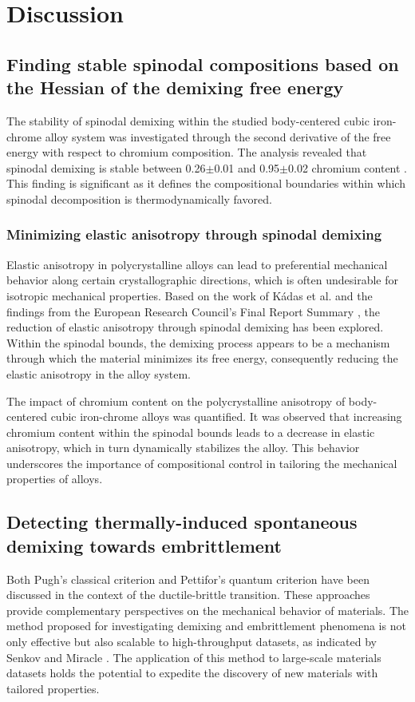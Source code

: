 \section{Discussion}

\subsection{Finding stable spinodal compositions based on the Hessian of the demixing free energy}

The stability of spinodal demixing within the studied body-centered cubic iron-chrome alloy system was investigated through the second derivative of the free energy with respect to chromium composition. The analysis revealed that spinodal demixing is stable between 0.26$\pm$0.01 and 0.95$\pm$0.02 chromium content \cite{korzhavyi2009electronic,trochet2021influence,levesque2011simple, binder2001spinodal}. This finding is significant as it defines the compositional boundaries within which spinodal decomposition is thermodynamically favored.

\subsubsection{Minimizing elastic anisotropy through spinodal demixing}
Elastic anisotropy in polycrystalline alloys can lead to preferential mechanical behavior along certain crystallographic directions, which is often undesirable for isotropic mechanical properties. Based on the work of Kádas et al. \cite{kadas2011thermo} and the findings from the European Research Council's Final Report Summary \cite{euroresearchcouncil2014}, the reduction of elastic anisotropy through spinodal demixing has been explored. Within the spinodal bounds, the demixing process appears to be a mechanism through which the material minimizes its free energy, consequently reducing the elastic anisotropy in the alloy system.

The impact of chromium content on the polycrystalline anisotropy of body-centered cubic iron-chrome alloys was quantified. It was observed that increasing chromium content within the spinodal bounds leads to a decrease in elastic anisotropy, which in turn dynamically stabilizes the alloy. This behavior underscores the importance of compositional control in tailoring the mechanical properties of alloys.


\subsection{Detecting thermally-induced spontaneous demixing towards embrittlement}
Both Pugh's classical criterion and Pettifor's quantum criterion have been discussed in the context of the ductile-brittle transition. These approaches provide complementary perspectives on the mechanical behavior of materials. The method proposed for investigating demixing and embrittlement phenomena is not only effective but also scalable to high-throughput datasets, as indicated by Senkov and Miracle \cite{senkov2021}. The application of this method to large-scale materials datasets holds the potential to expedite the discovery of new materials with tailored properties.

